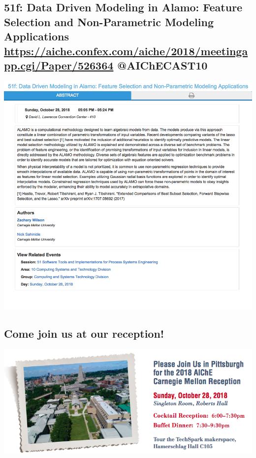 \documentclass[11pt]{article}
\begin{document}
\subsection{51f: Data Driven Modeling in Alamo: Feature Selection and Non-Parametric Modeling Applications \url{https://aiche.confex.com/aiche/2018/meetingapp.cgi/Paper/526364} @AIChECAST10}
\label{sec:org6758879}
\begin{center}
\includegraphics[width=.9\linewidth]{./526364.png}
\end{center}

\subsection{Come join us at our reception!}
\label{sec:org805be9e}

\begin{center}
\includegraphics[width=.9\linewidth]{./screenshots/date-21-10-2018-time-09-21-08.png}
\end{center}
\end{document}
